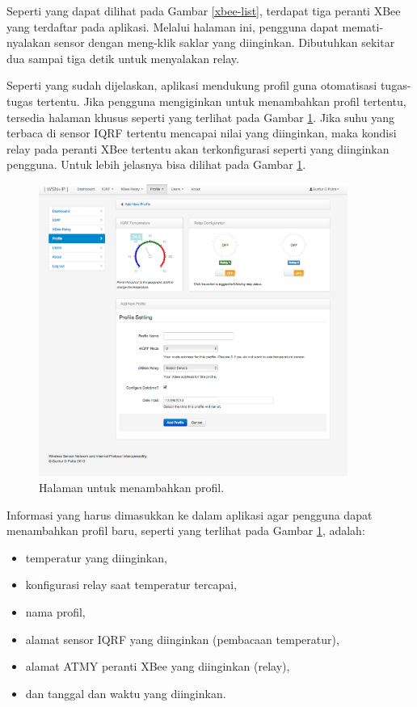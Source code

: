 			Seperti yang dapat dilihat pada Gambar \ref{xbee-list}, terdapat tiga peranti XBee yang terdaftar pada aplikasi. Melalui halaman ini, pengguna dapat memati-nyalakan sensor dengan meng-klik saklar yang diinginkan. Dibutuhkan sekitar dua sampai tiga detik untuk menyalakan relay.

			Seperti yang sudah dijelaskan, aplikasi mendukung profil guna otomatisasi tugas-tugas tertentu. Jika pengguna mengiginkan untuk menambahkan profil tertentu, tersedia halaman khusus seperti yang terlihat pada Gambar \ref{profile-add}. Jika suhu yang terbaca di sensor IQRF tertentu mencapai nilai yang diinginkan, maka kondisi relay pada peranti XBee tertentu akan terkonfigurasi seperti yang diinginkan pengguna. Untuk lebih jelasnya bisa dilihat pada Gambar \ref{profile-add}.

				\begin{figure}[H]
				  \centering
				    \includegraphics[width=0.9\textwidth]{gambar/profile-add}
				    \caption{Halaman untuk menambahkan profil.}
				    \label{profile-add}
				\end{figure}

			Informasi yang harus dimasukkan ke dalam aplikasi agar pengguna dapat menambahkan profil baru, seperti yang terlihat pada Gambar \ref{profile-add}, adalah:

				\begin{itemize}
					\item temperatur yang diinginkan,
					\item konfigurasi relay saat temperatur tercapai,
					\item nama profil,
					\item alamat sensor IQRF yang diinginkan (pembacaan temperatur),
					\item alamat ATMY peranti XBee yang diinginkan (relay),
					\item dan tanggal dan waktu yang diinginkan.
				\end{itemize}


